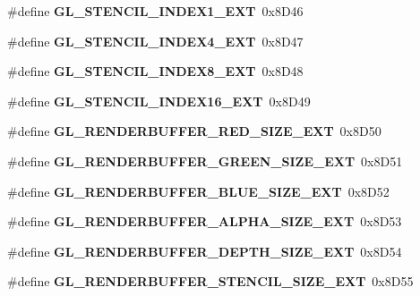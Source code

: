 \begin{DoxyCompactItemize}
\item 
\#define {\bfseries G\+L\+\_\+\+S\+T\+E\+N\+C\+I\+L\+\_\+\+I\+N\+D\+E\+X1\+\_\+\+E\+X\+T}~0x8\+D46\label{_s_d_l__opengl_8h_a3a2da24fcb2c123fb45df3ade27602b1}

\item 
\#define {\bfseries G\+L\+\_\+\+S\+T\+E\+N\+C\+I\+L\+\_\+\+I\+N\+D\+E\+X4\+\_\+\+E\+X\+T}~0x8\+D47\label{_s_d_l__opengl_8h_a82bcf75fb2f7b0d550ffb6e0ccc942ed}

\item 
\#define {\bfseries G\+L\+\_\+\+S\+T\+E\+N\+C\+I\+L\+\_\+\+I\+N\+D\+E\+X8\+\_\+\+E\+X\+T}~0x8\+D48\label{_s_d_l__opengl_8h_af9ee0fca7fa7d1900f982c97c18bef79}

\item 
\#define {\bfseries G\+L\+\_\+\+S\+T\+E\+N\+C\+I\+L\+\_\+\+I\+N\+D\+E\+X16\+\_\+\+E\+X\+T}~0x8\+D49\label{_s_d_l__opengl_8h_a6b4436419191cffbd0c5bf603c77b0d8}

\item 
\#define {\bfseries G\+L\+\_\+\+R\+E\+N\+D\+E\+R\+B\+U\+F\+F\+E\+R\+\_\+\+R\+E\+D\+\_\+\+S\+I\+Z\+E\+\_\+\+E\+X\+T}~0x8\+D50\label{_s_d_l__opengl_8h_a714c447403500de38ae3739f06749aa9}

\item 
\#define {\bfseries G\+L\+\_\+\+R\+E\+N\+D\+E\+R\+B\+U\+F\+F\+E\+R\+\_\+\+G\+R\+E\+E\+N\+\_\+\+S\+I\+Z\+E\+\_\+\+E\+X\+T}~0x8\+D51\label{_s_d_l__opengl_8h_a17aa1b50023303d3bc294cf0ad1d3163}

\item 
\#define {\bfseries G\+L\+\_\+\+R\+E\+N\+D\+E\+R\+B\+U\+F\+F\+E\+R\+\_\+\+B\+L\+U\+E\+\_\+\+S\+I\+Z\+E\+\_\+\+E\+X\+T}~0x8\+D52\label{_s_d_l__opengl_8h_a7746d021dd93f9bff471a4ae0b86f355}

\item 
\#define {\bfseries G\+L\+\_\+\+R\+E\+N\+D\+E\+R\+B\+U\+F\+F\+E\+R\+\_\+\+A\+L\+P\+H\+A\+\_\+\+S\+I\+Z\+E\+\_\+\+E\+X\+T}~0x8\+D53\label{_s_d_l__opengl_8h_aafa214ca3a39e56903514093665f3946}

\item 
\#define {\bfseries G\+L\+\_\+\+R\+E\+N\+D\+E\+R\+B\+U\+F\+F\+E\+R\+\_\+\+D\+E\+P\+T\+H\+\_\+\+S\+I\+Z\+E\+\_\+\+E\+X\+T}~0x8\+D54\label{_s_d_l__opengl_8h_a55b83b8a69bfa7db2f66658bc0e5ae4e}

\item 
\#define {\bfseries G\+L\+\_\+\+R\+E\+N\+D\+E\+R\+B\+U\+F\+F\+E\+R\+\_\+\+S\+T\+E\+N\+C\+I\+L\+\_\+\+S\+I\+Z\+E\+\_\+\+E\+X\+T}~0x8\+D55\label{_s_d_l__opengl_8h_a496995d1217f9491f9125166d68a80f4}


\end{DoxyCompactItemize}
